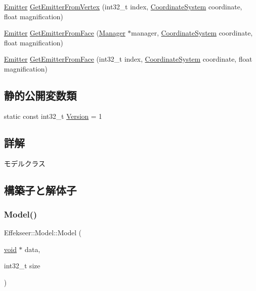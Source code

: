 \begin{DoxyCompactItemize}
\item 
\mbox{\hyperlink{struct_effekseer_1_1_model_1_1_emitter}{Emitter}} \mbox{\hyperlink{class_effekseer_1_1_model_abe1b586ac7cab23902e05c76b6b02349}{Get\+Emitter\+From\+Vertex}} (int32\+\_\+t index, \mbox{\hyperlink{namespace_effekseer_ac8508f8823c5fcf36aac5d2ddee23765}{Coordinate\+System}} coordinate, float magnification)
\item 
\mbox{\hyperlink{struct_effekseer_1_1_model_1_1_emitter}{Emitter}} \mbox{\hyperlink{class_effekseer_1_1_model_a2b8c3620fca55d7eb3df9f6e91ac11d9}{Get\+Emitter\+From\+Face}} (\mbox{\hyperlink{class_effekseer_1_1_manager}{Manager}} $\ast$manager, \mbox{\hyperlink{namespace_effekseer_ac8508f8823c5fcf36aac5d2ddee23765}{Coordinate\+System}} coordinate, float magnification)
\item 
\mbox{\hyperlink{struct_effekseer_1_1_model_1_1_emitter}{Emitter}} \mbox{\hyperlink{class_effekseer_1_1_model_a3d79aac3003fba431ea3c9e815647334}{Get\+Emitter\+From\+Face}} (int32\+\_\+t index, \mbox{\hyperlink{namespace_effekseer_ac8508f8823c5fcf36aac5d2ddee23765}{Coordinate\+System}} coordinate, float magnification)
\end{DoxyCompactItemize}
\subsection*{静的公開変数類}
\begin{DoxyCompactItemize}
\item 
static const int32\+\_\+t \mbox{\hyperlink{class_effekseer_1_1_model_a9f5c2f10fde65efeb5bc603ed9d6436e}{Version}} = 1
\end{DoxyCompactItemize}


\subsection{詳解}
モデルクラス 

\subsection{構築子と解体子}
\mbox{\label{class_effekseer_1_1_model_a6e13732e632a25f8368b698b9c21e61d}} 
\subsubsection{\texorpdfstring{Model()}{Model()}}
{\footnotesize\ttfamily Effekseer\+::\+Model\+::\+Model (\begin{DoxyParamCaption}\item[{\mbox{\hyperlink{namespace_effekseer_ab34c4088e512200cf4c2716f168deb56}{void}} $\ast$}]{data,  }\item[{int32\+\_\+t}]{size }\end{DoxyParamCaption})\hspace{0.3cm}{\ttfamily [inline]}}



